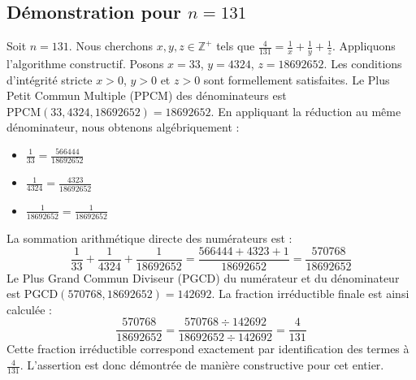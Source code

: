 \documentclass[11pt,a4paper]{article}
\begin{document}
\subsection{Démonstration pour $n = 131$}
Soit $n = 131$. Nous cherchons $x, y, z \in \mathbb{Z}^{+}$ tels que $\frac{4}{131} = \frac{1}{x} + \frac{1}{y} + \frac{1}{z}$.
Appliquons l'algorithme constructif. Posons $x = 33$, $y = 4324$, $z = 18692652$.
Les conditions d'intégrité stricte $x > 0$, $y > 0$ et $z > 0$ sont formellement satisfaites.
Le Plus Petit Commun Multiple (PPCM) des dénominateurs est $\text{PPCM}(33, 4324, 18692652) = 18692652$.
En appliquant la réduction au même dénominateur, nous obtenons algébriquement :
\begin{itemize}
    \item $\frac{1}{33} = \frac{566444}{18692652}$
    \item $\frac{1}{4324} = \frac{4323}{18692652}$
    \item $\frac{1}{18692652} = \frac{1}{18692652}$
\end{itemize}
La sommation arithmétique directe des numérateurs est :
$$ \frac{1}{33} + \frac{1}{4324} + \frac{1}{18692652} = \frac{566444 + 4323 + 1}{18692652} = \frac{570768}{18692652} $$
Le Plus Grand Commun Diviseur (PGCD) du numérateur et du dénominateur est $\text{PGCD}(570768, 18692652) = 142692$.
La fraction irréductible finale est ainsi calculée :
$$ \frac{570768}{18692652} = \frac{570768 \div 142692}{18692652 \div 142692} = \frac{4}{131} $$
Cette fraction irréductible correspond exactement par identification des termes à $\frac{4}{131}$. L'assertion est donc démontrée de manière constructive pour cet entier.
\end{document}
